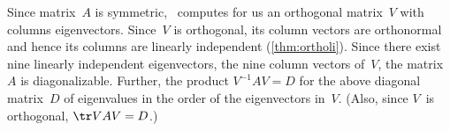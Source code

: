 \begin{example}
\begin{solution}
Since matrix~\(A\) is symmetric, \script\ computes for us an orthogonal matrix~\(V\) with columns eigenvectors.
Since~\(V\) is orthogonal, its column vectors are orthonormal and hence its columns are linearly independent (\cref{thm:ortholi}).
Since there exist nine linearly independent eigenvectors, the nine column vectors of~\(V\), the matrix~\(A\) is diagonalizable.
Further, the product \(V^{-1}AV=D\) for the above diagonal matrix~\(D\) of eigenvalues in the order of the eigenvectors in~\(V\).
(Also, since \(V\)~is orthogonal, \(\tr VAV=D\).)
\aqed


\end{solution}
\end{example}
